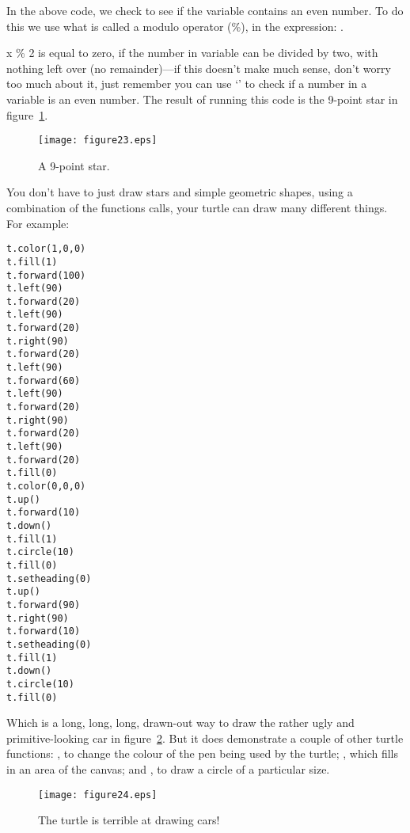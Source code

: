 In the above code, we check to see if the variable  contains an even number.  To do this we use what is called a modulo operator (\%), in the expression: .
\par
x \% 2 is equal to zero, if the number in variable  can be divided by two, with nothing left over (no remainder)---if this doesn't make much sense, don't worry too much about it, just remember you can use `' to check if a number in a variable is an even number.  The result of running this code is the 9-point star in figure~\ref{fig23}.

\begin{figure}
\begin{center}
\texttt{[image: figure23.eps]}
\end{center}
\caption{A 9-point star.}\label{fig23}
\end{figure}

You don't have to just draw stars and simple geometric shapes, using a combination of the functions calls, your turtle can draw many different things.  For example:

\begin{listing}
\begin{verbatim}
t.color(1,0,0)
t.fill(1)
t.forward(100)
t.left(90)
t.forward(20)
t.left(90)
t.forward(20)
t.right(90)
t.forward(20)
t.left(90)
t.forward(60)
t.left(90)
t.forward(20)
t.right(90)
t.forward(20)
t.left(90)
t.forward(20)
t.fill(0)
t.color(0,0,0)
t.up()
t.forward(10)
t.down()
t.fill(1)
t.circle(10)
t.fill(0)
t.setheading(0)
t.up()
t.forward(90)
t.right(90)
t.forward(10)
t.setheading(0)
t.fill(1)
t.down()
t.circle(10)
t.fill(0)
\end{verbatim}
\end{listing}

\noindent
Which is a long, long, long, drawn-out way to draw the rather ugly and primitive-looking car in figure~\ref{fig24}. But it does demonstrate a couple of other turtle functions:  , to change the colour of the pen being used by the turtle; , which fills in an area of the canvas; and , to draw a circle of a particular size.

\begin{figure}
\begin{center}
\texttt{[image: figure24.eps]}
\end{center}
\caption{The turtle is terrible at drawing cars!}\label{fig24}
\end{figure}

